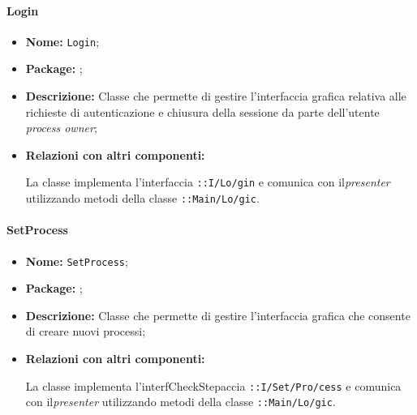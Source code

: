 \paragraph{Login}
\begin{flushleft}
\begin{itemize}
\item \textbf{Nome:} \texttt{Login};
\item \textbf{Package:} \texttt{\viewAdmin{}};
\item \textbf{Descrizione:} Classe che permette di gestire l'interfaccia grafica relativa alle richieste di autenticazione e chiusura della sessione da parte dell'utente \textit{process owner};
\item \textbf{Relazioni con altri componenti:}
\begin{sloppypar}
La classe implementa l'interfaccia \texttt{\iViewAdmin{}::I\fshyp{}Lo\fshyp{}gin} e comunica con il\textit{presenter} utilizzando metodi della classe \texttt{\logicAdmin{}::Main\fshyp{}Lo\fshyp{}gic}.
\end{sloppypar}
\end{itemize}
\end{flushleft}

\paragraph{SetProcess}
\begin{flushleft}
\begin{itemize}
\item \textbf{Nome:} \texttt{SetProcess};
\item \textbf{Package:} \texttt{\viewAdmin{}};
\item \textbf{Descrizione:} Classe che permette di gestire l'interfaccia grafica che consente di creare nuovi processi;
\item \textbf{Relazioni con altri componenti:}
\begin{sloppypar}
La classe implementa l'interfCheckStepaccia \texttt{\iViewAdmin{}::I\fshyp{}Set\fshyp{}Pro\fshyp{}cess} e comunica con il\textit{presenter} utilizzando metodi della classe \texttt{\logicAdmin{}::Main\fshyp{}Lo\fshyp{}gic}.
\end{sloppypar}
\end{itemize}
\end{flushleft}

